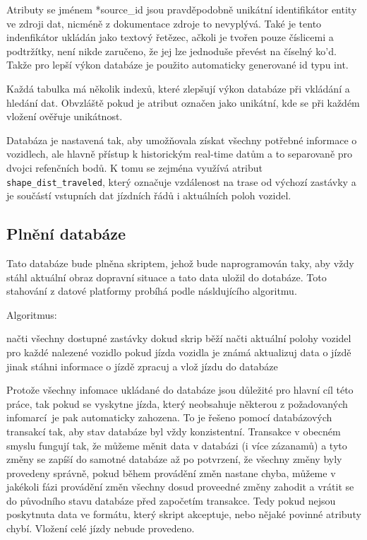 Atributy se jménem *source\_id jsou pravděpodobně unikátní identifikátor entity ve zdroji dat, nicméně z dokumentace zdroje to nevyplývá. Také je tento indenfikátor ukládán jako textový řetězec, ačkoli je tvořen pouze číslicemi a podtržítky, není nikde zaručeno, že jej lze jednoduše převést na číselný ko'd. Takže pro lepší výkon databáze je použito automaticky generované id typu \gls{int}.

\bigbreak

Každá tabulka má několik indexů, které zlepšují výkon databáze při vkládání a hledání dat. Obvzláště pokud je atribut označen jako unikátní, kde se při každém vložení ověřuje unikátnost.

\bigbreak

Databáza je nastavená tak, aby umožňovala získat všechny potřebné informace o vozidlech, ale hlavně přístup k historickým real-time datům a to separovaně pro dvojci refenčních bodů. K tomu se zejména využívá atribut \verb-shape_dist_traveled-, který označuje vzdálenost na trase od výchozí zastávky a je součástí vstupních dat jízdních řádů i aktuálních poloh vozidel.

\subsection{Plnění databáze}

Tato databáze bude plněna skriptem, jehož bude naprogramován taky, aby vždy stáhl aktuální obraz dopravní situace a tato data uložil do dotabáze. Toto stahování z datové platformy probíhá podle násldujícího algoritmu.

\bigbreak

Algoritmus:
\begin{code}[frame=none]
načti všechny dostupné zastávky
dokud skrip běží
  načti aktuální polohy vozidel
  pro každé nalezené vozidlo
  pokud jízda vozidla je známá
    aktualizuj data o jízdě
  jinak
    stáhni informace o jízdě
    zpracuj a vlož jízdu do databáze
\end{code}

\bigbreak

Protože všechny infomace ukládané do databáze jsou důležité pro hlavní cíl této práce, tak pokud se vyskytne jízda, který neobsahuje některou z požadovaných infomarcí je pak automaticky zahozena. To je řešeno pomocí databázových transakcí tak, aby stav databáze byl vždy konzistentní. Transakce v obecném smyslu fungují tak, že můžeme měnit data v databázi (i více zázanamů) a tyto změny se zapíší do samotné databáze až po potvrzení, že všechny změny byly provedeny správně, pokud během provádění změn nastane chyba, můžeme v jakékoli fázi provádění změn všechny dosud proveedné změny zahodit a vrátit se do původního stavu databáze před započetím transakce.  Tedy pokud nejsou poskytnuta data ve formátu, který skript akceptuje, nebo nějaké povinné atributy chybí. Vložení celé jízdy nebude provedeno.

